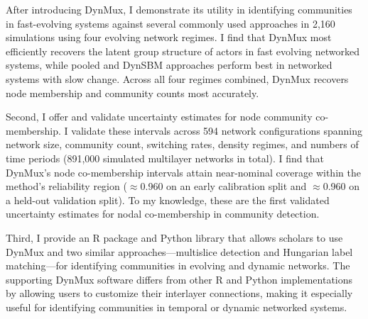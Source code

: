 \documentclass[11pt, letterpaper]{article}
\begin{document}
After introducing DynMux, I demonstrate its utility in identifying communities in fast-evolving  systems against several commonly used approaches in 2,160 simulations using four evolving network regimes. %
I find that DynMux most efficiently recovers the latent group structure of actors in fast evolving networked systems, while pooled and DynSBM approaches perform best in networked systems with slow change. Across all four regimes combined, DynMux recovers node membership and community counts most accurately.%


Second, I offer and validate uncertainty estimates for node community co-membership. I validate these intervals across 594 network configurations spanning network size, community count, switching rates, density regimes, and numbers of time periods (891,000 simulated multilayer networks in total). I find that DynMux's node co-membership intervals attain near-nominal coverage within the method's reliability region ($\approx$0.960 on an early calibration split and $\approx$0.960 on a held-out validation split). To my knowledge, these are the first validated uncertainty estimates for nodal co-membership in community detection.

Third, I provide an R package and Python library that allows scholars to use DynMux and two similar approaches---multislice detection and Hungarian label matching---for identifying communities in evolving and dynamic networks. The supporting DynMux software differs from other R and Python implementations by allowing users to customize their interlayer connections, making it especially useful for identifying communities in temporal or dynamic networked systems.
\end{document}
